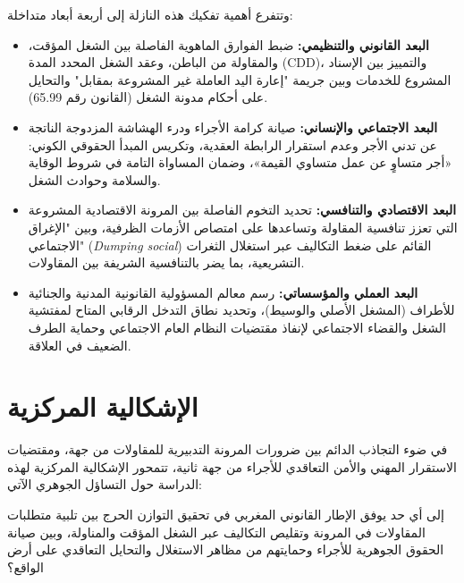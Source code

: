 وتتفرع أهمية تفكيك هذه النازلة إلى أربعة أبعاد متداخلة:
\begin{itemize}
    \item \textbf{البعد القانوني والتنظيمي:} ضبط الفوارق الماهوية الفاصلة بين الشغل المؤقت، والمقاولة من الباطن، وعقد الشغل المحدد المدة (CDD)، والتمييز بين الإسناد المشروع للخدمات وبين جريمة "إعارة اليد العاملة غير المشروعة بمقابل" والتحايل على أحكام مدونة الشغل (القانون رقم 65.99).
    \item \textbf{البعد الاجتماعي والإنساني:} صيانة كرامة الأجراء ودرء الهشاشة المزدوجة الناتجة عن تدني الأجر وعدم استقرار الرابطة العقدية، وتكريس المبدأ الحقوقي الكوني: «أجر متساوٍ عن عمل متساوي القيمة»، وضمان المساواة التامة في شروط الوقاية والسلامة وحوادث الشغل.
    \item \textbf{البعد الاقتصادي والتنافسي:} تحديد التخوم الفاصلة بين المرونة الاقتصادية المشروعة التي تعزز تنافسية المقاولة وتساعدها على امتصاص الأزمات الظرفية، وبين "الإغراق الاجتماعي" (\textit{Dumping social}) القائم على ضغط التكاليف عبر استغلال الثغرات التشريعية، بما يضر بالتنافسية الشريفة بين المقاولات.
    \item \textbf{البعد العملي والمؤسساتي:} رسم معالم المسؤولية القانونية المدنية والجنائية للأطراف (المشغل الأصلي والوسيط)، وتحديد نطاق التدخل الرقابي المتاح لمفتشية الشغل والقضاء الاجتماعي لإنفاذ مقتضيات النظام العام الاجتماعي وحماية الطرف الضعيف في العلاقة.
\end{itemize}

\section*{الإشكالية المركزية}

في ضوء التجاذب الدائم بين ضرورات المرونة التدبيرية للمقاولات من جهة، ومقتضيات الاستقرار المهني والأمن التعاقدي للأجراء من جهة ثانية، تتمحور الإشكالية المركزية لهذه الدراسة حول التساؤل الجوهري الآتي:

\begin{tcolorbox}[colback=lightgray, colframe=maincolor, arc=5pt, title=\textbf{الإشكالية المحورية}, fonttitle=\bfseries]
\centering
\large
إلى أي حد يوفق الإطار القانوني المغربي في تحقيق التوازن الحرج بين تلبية متطلبات المقاولات في المرونة وتقليص التكاليف عبر الشغل المؤقت والمناولة، وبين صيانة الحقوق الجوهرية للأجراء وحمايتهم من مظاهر الاستغلال والتحايل التعاقدي على أرض الواقع؟
\end{tcolorbox}

